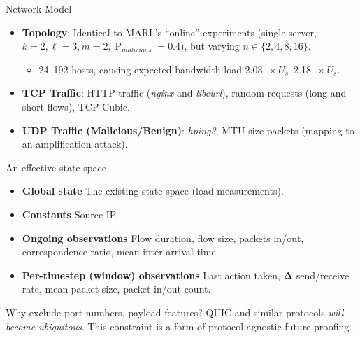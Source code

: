 \documentclass[aspectratio=169,xcolor={dvipsnames}
,hide notes
]{beamer}
\begin{document}
\begin{frame}{Network Model}
\begin{itemize}
	\item \textbf{Topology}: Identical to MARL's ``online'' experiments (single server, $k=2, \ell=3, m=2, \operatorname{P}_{\mathit{malicious}}=0.4$), but varying $n \in \{2, 4, 8, 16\}$.
	\begin{itemize}
		\item \numrange{24}{192} hosts, causing expected bandwidth load \SIrange{2.03}{2.18}{$\! \times U_s$}.
	\end{itemize}
	\item \textbf{TCP Traffic}: HTTP traffic (\emph{nginx} and \emph{libcurl}), random requests (long and short flows), TCP Cubic.
	\item \textbf{UDP Traffic (Malicious/Benign)}: \emph{hping3}, MTU-size packets (mapping to an amplification attack).
\end{itemize}
\end{frame}

\begin{frame}{An effective state space}
\begin{itemize}
	\item \textbf{Global state} The existing state space (load measurements).
	\item \textbf{Constants} Source IP.
	\item \textbf{Ongoing observations} Flow duration, flow size, packets in/out, correspondence ratio, mean inter-arrival time.
	\item \textbf{Per-timestep (window) observations} Last action taken, $\mathbf{\Delta}$ send/receive rate, mean packet size, packet in/out count.
\end{itemize}

	Why exclude port numbers, payload features? \alert{QUIC} and similar protocols \emph{will become ubiquitous}. \alert{This constraint is a form of protocol-agnostic future-proofing}.

\end{frame}
\end{document}
